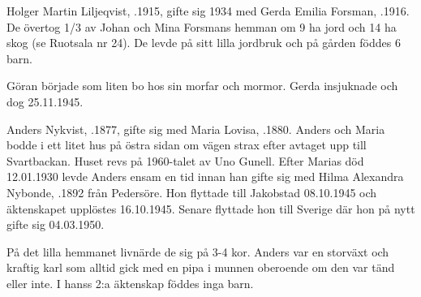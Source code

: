 Holger Martin Liljeqvist, .1915, gifte sig 1934 med Gerda Emilia Forsman, .1916. De övertog 1/3 av Johan och Mina Forsmans hemman om 9 ha jord och 14 ha skog (se Ruotsala nr 24). De levde på sitt lilla jordbruk och på gården föddes 6 barn.
\begin{jhchildren}
  \item {}
  \item {}
  \item {}
  \item {}
  \item {}
  \item {}
\end{jhchildren}

Göran började som liten bo hos sin morfar och mormor. Gerda insjuknade och dog 25.11.1945.





Anders Nykvist, .1877, gifte sig med Maria Lovisa, .1880. Anders och Maria bodde i ett litet hus på östra sidan om vägen strax efter avtaget upp till Svartbackan. Huset revs på 1960-talet av Uno Gunell. Efter Marias död 12.01.1930 levde Anders ensam en tid innan han gifte sig med Hilma Alexandra Nybonde, .1892 från Pedersöre. Hon flyttade till Jakobstad 08.10.1945 och äktenskapet upplöstes 16.10.1945. Senare flyttade hon till Sverige där hon på nytt gifte sig 04.03.1950.

På det lilla hemmanet livnärde de sig på 3-4 kor. Anders var en storväxt och kraftig karl som alltid gick med en pipa i munnen oberoende om den var tänd eller inte. I hanss 2:a äktenskap föddes inga barn.
\begin{jhchildren}
  \item {}
  \item {}
  \item {}
  \item {}
  \item {}
  \item {}
\end{jhchildren}

